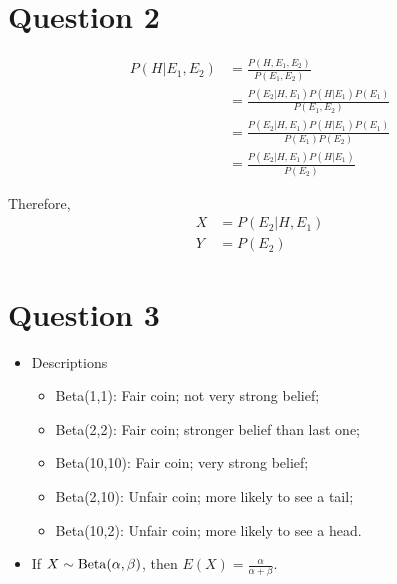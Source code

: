 \documentclass[11pt]{article}
\begin{document}
\section*{Question 2}
\begin{eqnarray*}
  P(H | E_1, E_2) & = \frac{P(H, E_1, E_2)}{P(E_1, E_2)} \\
  & = \frac{P(E_2 | H, E_1) P(H | E_1) P(E_1)}{P(E_1, E_2)} \\
  & = \frac{P(E_2 | H, E_1) P(H | E_1) P(E_1)}{P(E_1) P(E_2)} \\
  & = \frac{P(E_2 | H, E_1) P(H | E_1)}{P(E_2)}
\end{eqnarray*}

Therefore,
\begin{eqnarray*}
  X & = P(E_2 | H, E_1) \\
  Y & = P(E_2)
\end{eqnarray*}

\section*{Question 3}
\begin{itemize}
\item Descriptions
  \begin{itemize}
  \item Beta(1,1): Fair coin; not very strong belief;
  \item Beta(2,2): Fair coin; stronger belief than last one;
  \item Beta(10,10): Fair coin; very strong belief;
  \item Beta(2,10): Unfair coin; more likely to see a tail;
  \item Beta(10,2): Unfair coin; more likely to see a head.
  \end{itemize}
\item If $X \sim {\rm Beta}(\alpha, \beta)$, then $E(X) =
  \frac{\alpha}{\alpha + \beta}$.
\end{itemize}
\end{document}
